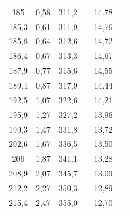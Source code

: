 \documentclass[a4paper,12pt]{report}
\begin{document}
\begin{table}[h!]
\begin{tabular}{|c|c|c|c|c|c|}
185       & 0,58 & 311,2 &                       & 14,78                            &                                        \\ \cline{1-3} \cline{5-5}
185,3     & 0,61 & 311,9 &                       & 14,76                            &                                        \\ \cline{1-3} \cline{5-5}
185,8     & 0,64 & 312,6 &                       & 14,72                            &                                        \\ \cline{1-3} \cline{5-5}
186,4     & 0,67 & 313,3 &                       & 14,67                            &                                        \\ \cline{1-3} \cline{5-5}
187,9     & 0,77 & 315,6 &                       & 14,55                            &                                        \\ \cline{1-3} \cline{5-5}
189,4     & 0,87 & 317,9 &                       & 14,44                            &                                        \\ \cline{1-3} \cline{5-5}
192,5     & 1,07 & 322,6 &                       & 14,21                            &                                        \\ \cline{1-3} \cline{5-5}
195,9     & 1,27 & 327,2 &                       & 13,96                            &                                        \\ \cline{1-3} \cline{5-5}
199,3     & 1,47 & 331,8 &                       & 13,72                            &                                        \\ \cline{1-3} \cline{5-5}
202,6     & 1,67 & 336,5 &                       & 13,50                            &                                        \\ \cline{1-3} \cline{5-5}
206       & 1,87 & 341,1 &                       & 13,28                            &                                        \\ \cline{1-3} \cline{5-5}
208,9     & 2,07 & 345,7 &                       & 13,09                            &                                        \\ \cline{1-3} \cline{5-5}
212,2     & 2,27 & 350,3 &                       & 12,89                            &                                        \\ \cline{1-3} \cline{5-5}
215,4     & 2,47 & 355,0 &                       & 12,70                            &                                        \\ \cline{1-3} \cline{5-5}

\end{tabular}
\end{table}
\end{document}
